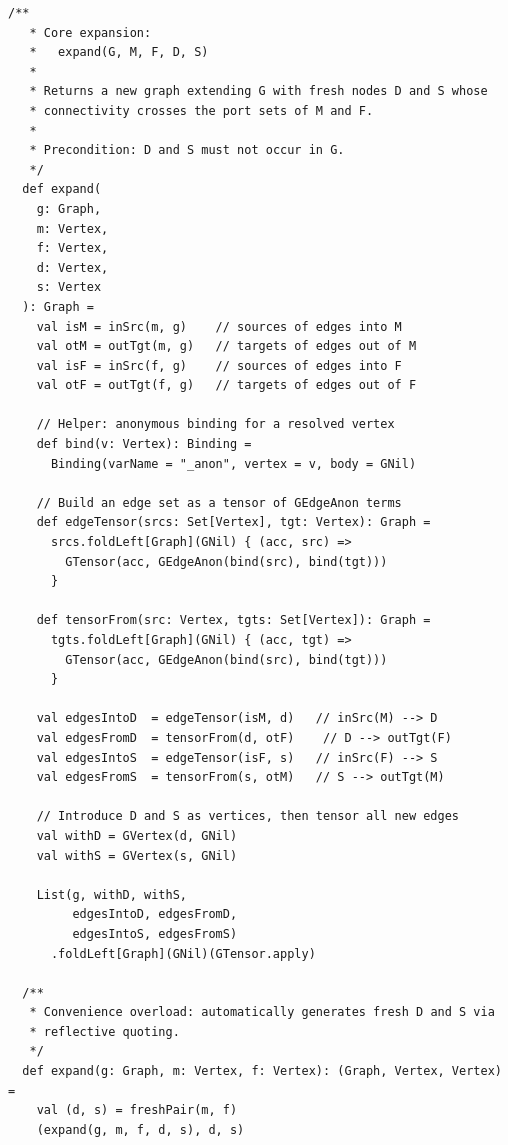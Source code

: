 \documentclass[11pt, a4paper]{article}
\theoremstyle{definition}
\theoremstyle{plain}
\theoremstyle{remark}
\begin{document}
\begin{lstlisting}[style=scala, caption={The expand operation}]
  /**
   * Core expansion:
   *   expand(G, M, F, D, S)
   *
   * Returns a new graph extending G with fresh nodes D and S whose
   * connectivity crosses the port sets of M and F.
   *
   * Precondition: D and S must not occur in G.
   */
  def expand(
    g: Graph,
    m: Vertex,
    f: Vertex,
    d: Vertex,
    s: Vertex
  ): Graph =
    val isM = inSrc(m, g)    // sources of edges into M
    val otM = outTgt(m, g)   // targets of edges out of M
    val isF = inSrc(f, g)    // sources of edges into F
    val otF = outTgt(f, g)   // targets of edges out of F

    // Helper: anonymous binding for a resolved vertex
    def bind(v: Vertex): Binding =
      Binding(varName = "_anon", vertex = v, body = GNil)

    // Build an edge set as a tensor of GEdgeAnon terms
    def edgeTensor(srcs: Set[Vertex], tgt: Vertex): Graph =
      srcs.foldLeft[Graph](GNil) { (acc, src) =>
        GTensor(acc, GEdgeAnon(bind(src), bind(tgt)))
      }

    def tensorFrom(src: Vertex, tgts: Set[Vertex]): Graph =
      tgts.foldLeft[Graph](GNil) { (acc, tgt) =>
        GTensor(acc, GEdgeAnon(bind(src), bind(tgt)))
      }

    val edgesIntoD  = edgeTensor(isM, d)   // inSrc(M) --> D
    val edgesFromD  = tensorFrom(d, otF)    // D --> outTgt(F)
    val edgesIntoS  = edgeTensor(isF, s)   // inSrc(F) --> S
    val edgesFromS  = tensorFrom(s, otM)   // S --> outTgt(M)

    // Introduce D and S as vertices, then tensor all new edges
    val withD = GVertex(d, GNil)
    val withS = GVertex(s, GNil)

    List(g, withD, withS,
         edgesIntoD, edgesFromD,
         edgesIntoS, edgesFromS)
      .foldLeft[Graph](GNil)(GTensor.apply)

  /**
   * Convenience overload: automatically generates fresh D and S via
   * reflective quoting.
   */
  def expand(g: Graph, m: Vertex, f: Vertex): (Graph, Vertex, Vertex) =
    val (d, s) = freshPair(m, f)
    (expand(g, m, f, d, s), d, s)
\end{lstlisting}
\end{document}
